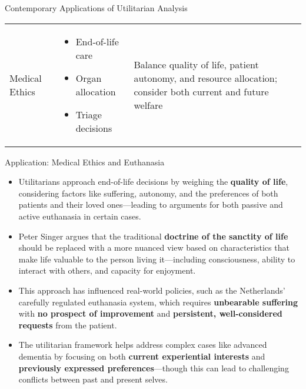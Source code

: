 \documentclass[aspectratio=169]{beamer}
\begin{document}
\begin{frame}{Contemporary Applications of Utilitarian Analysis}
\begin{table}[]
\begin{tabular}{p{2.2cm}p{3.5cm}p{3.5cm}}
            Medical Ethics & \begin{itemize}\setlength\itemsep{0em}
                \item End-of-life care
                \item Organ allocation
                \item Triage decisions
            \end{itemize} & 
            Balance quality of life, patient autonomy, and resource allocation; consider both current and future welfare
        \end{tabular}
    \end{table}
\end{frame}
\begin{frame}{Application: Medical Ethics and Euthanasia}
    \begin{itemize}
        \item Utilitarians approach end-of-life decisions by weighing the \textbf{quality of life}, considering factors like suffering, autonomy, and the preferences of both patients and their loved ones—leading to arguments for both passive and active euthanasia in certain cases.
        
        \item Peter Singer argues that the traditional \textbf{doctrine of the sanctity of life} should be replaced with a more nuanced view based on characteristics that make life valuable to the person living it—including consciousness, ability to interact with others, and capacity for enjoyment.
        
        \item This approach has influenced real-world policies, such as the Netherlands' carefully regulated euthanasia system, which requires \textbf{unbearable suffering} with \textbf{no prospect of improvement} and \textbf{persistent, well-considered requests} from the patient.
        
        \item The utilitarian framework helps address complex cases like advanced dementia by focusing on both \textbf{current experiential interests} and \textbf{previously expressed preferences}—though this can lead to challenging conflicts between past and present selves.
    \end{itemize}
\end{frame}
\end{document}

